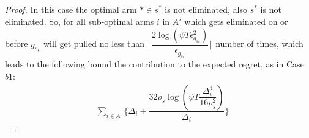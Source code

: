 \begin{proof}
In this case the optimal arm ${*}\in s^{*}$ is not eliminated, also $s^{*}$ is not eliminated. So, for all sub-optimal arms $i$ in $A'$ which gets eliminated on or before $g_{s_{k}}$ will get pulled no less than $\bigg\lceil\dfrac{2\log{(\psi T\epsilon_{g_{s_{k}}}^{2})}}{\epsilon_{g_{s_{k}}}}\bigg\rceil$ number of times, which leads to the following bound the contribution to the expected regret, as in Case $b1$:
% 
\begin{align*}
 &\sum_{i\in A^{'}}\bigg\lbrace \Delta_{i}+\dfrac{32\rho_{s}\log{(\psi T\dfrac{\Delta_{i}^{4}}{16\rho_{s}^{2}})}}{\Delta_{i}} \bigg\rbrace 
\end{align*} 

% 
% 
 

\end{proof}
